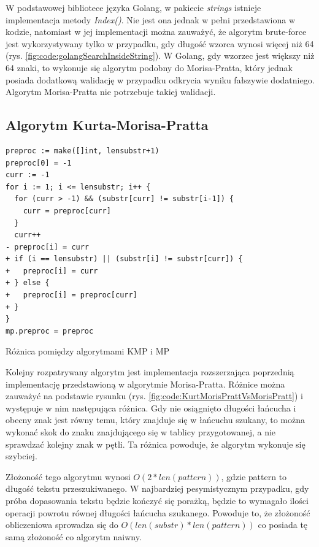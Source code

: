 W podstawowej bibliotece języka Golang, w pakiecie \textit{strings} istnieje 
implementacja metody \textit{Index()}. Nie jest ona jednak w pełni przedstawiona
w kodzie, natomiast w jej implementacji można zauważyć, że algorytm brute-force
jest wykorzystywany tylko w przypadku, gdy długość wzorca wynosi więcej niż 64 
(rys. \ref{fig:code:golangSearchInsideString}). W Golang, gdy wzorzec jest większy niż
64 znaki, to wykonuje się algorytm podobny do Morisa-Pratta, który jednak 
posiada dodatkową walidację w przypadku odkrycia wyniku fałszywie dodatniego. 
Algorytm Morisa-Pratta nie potrzebuje takiej walidacji.

\subsection{Algorytm Kurta-Morisa-Pratta}

\begin{listing}[H]
    \begin{verbatim}
preproc := make([]int, lensubstr+1)
preproc[0] = -1
curr := -1
for i := 1; i <= lensubstr; i++ {
  for (curr > -1) && (substr[curr] != substr[i-1]) {
    curr = preproc[curr]
  }
  curr++
- preproc[i] = curr
+ if (i == lensubstr) || (substr[i] != substr[curr]) {
+   preproc[i] = curr
+ } else {
+   preproc[i] = preproc[curr]
+ }
}
mp.preproc = preproc
    \end{verbatim}
  \caption{Różnica pomiędzy algorytmami KMP i MP}
  \label{fig:code:KurtMorisPrattVsMorisPratt}
\end{listing}

Kolejny rozpatrywany algorytm jest implementacja rozszerzająca poprzednią 
implementację przedstawioną w algorytmie Morisa-Pratta. Różnice można zauważyć na podstawie rysunku
(rys. \ref{fig:code:KurtMorisPrattVsMorisPratt}) i występuje w nim następująca różnica.
Gdy nie osiągnięto długości łańcucha i obecny znak jest równy temu, który 
znajduje się w łańcuchu szukany, to można wykonać skok do znaku znajdującego
się w tablicy przygotowanej, a nie sprawdzać kolejny znak w pętli. Ta różnica
powoduje, że algorytm wykonuje się szybciej.

Złożoność tego algorytmu wynosi $O(2*{len(pattern)})$, gdzie pattern to długość
tekstu przeszukiwanego. W najbardziej pesymistycznym przypadku, gdy próba dopasowania tekstu będzie 
kończyć się porażką, będzie to wymagało ilości operacji powrotu równej długości 
łańcucha szukanego. Powoduje to, że złożoność obliczeniowa sprowadza się do
$O({len(substr)}*{len(pattern)})$ co posiada tę samą złożoność co algorytm naiwny. 

